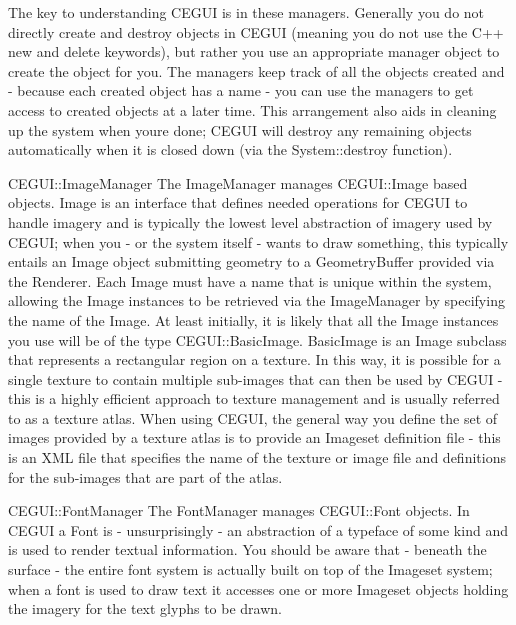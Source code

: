 The key to understanding C\+E\+G\+UI is in these managers. Generally you do not directly create and destroy objects in C\+E\+G\+UI (meaning you do not use the C++ {\ttfamily new} and {\ttfamily delete} keywords), but rather you use an appropriate manager object to create the object for you. The managers keep track of all the objects created and -\/ because each created object has a name -\/ you can use the managers to get access to created objects at a later time. This arrangement also aids in cleaning up the system when you\textquotesingle{}re done; C\+E\+G\+UI will destroy any remaining objects automatically when it is closed down (via the System\+::destroy function).

\begin{DoxyParagraph}{C\+E\+G\+UI\+::Image\+Manager}
The Image\+Manager manages C\+E\+G\+U\+I\+::\+Image based objects. Image is an interface that defines needed operations for C\+E\+G\+UI to handle imagery and is typically the lowest level abstraction of imagery used by C\+E\+G\+UI; when you -\/ or the system itself -\/ wants to draw something, this typically entails an Image object submitting geometry to a Geometry\+Buffer provided via the Renderer. Each Image must have a name that is unique within the system, allowing the Image instances to be retrieved via the Image\+Manager by specifying the name of the Image. At least initially, it is likely that all the Image instances you use will be of the type C\+E\+G\+U\+I\+::\+Basic\+Image. Basic\+Image is an Image subclass that represents a rectangular region on a texture. In this way, it is possible for a single texture to contain multiple sub-\/images that can then be used by C\+E\+G\+UI -\/ this is a highly efficient approach to texture management and is usually referred to as a texture atlas. When using C\+E\+G\+UI, the general way you define the set of images provided by a texture atlas is to provide an Imageset definition file -\/ this is an X\+ML file that specifies the name of the texture or image file and definitions for the sub-\/images that are part of the atlas.
\end{DoxyParagraph}
\begin{DoxyParagraph}{C\+E\+G\+UI\+::Font\+Manager}
The Font\+Manager manages C\+E\+G\+U\+I\+::\+Font objects. In C\+E\+G\+UI a Font is -\/ unsurprisingly -\/ an abstraction of a typeface of some kind and is used to render textual information. You should be aware that -\/ beneath the surface -\/ the entire font system is actually built on top of the Imageset system; when a font is used to draw text it accesses one or more Imageset objects holding the imagery for the text glyphs to be drawn.
\end{DoxyParagraph}
